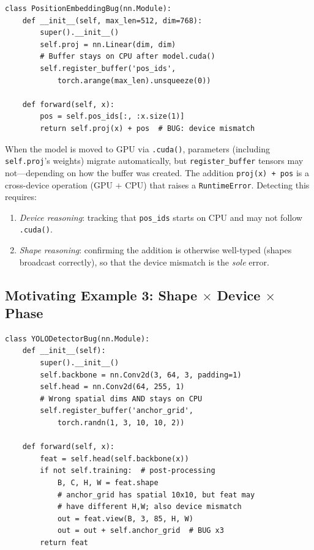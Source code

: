 \documentclass[10pt]{article}
\theoremstyle{plain}
\theoremstyle{definition}
\theoremstyle{remark}
\begin{document}
\begin{lstlisting}[caption={Buffer device mismatch modeled after
  HuggingFace Transformers issue \#13666.},
  label={lst:device-shape}]
class PositionEmbeddingBug(nn.Module):
    def __init__(self, max_len=512, dim=768):
        super().__init__()
        self.proj = nn.Linear(dim, dim)
        # Buffer stays on CPU after model.cuda()
        self.register_buffer('pos_ids',
            torch.arange(max_len).unsqueeze(0))

    def forward(self, x):
        pos = self.pos_ids[:, :x.size(1)]
        return self.proj(x) + pos  # BUG: device mismatch
\end{lstlisting}

When the model is moved to GPU via \texttt{.cuda()}, parameters
(including \texttt{self.proj}'s weights) migrate automatically, but
\texttt{register\_buffer} tensors may not---depending on how the
buffer was created.  The addition \texttt{proj(x) + pos} is a
cross-device operation (GPU $+$ CPU) that raises a
\texttt{RuntimeError}.  Detecting this requires:
\begin{enumerate}[nosep]
  \item \emph{Device reasoning}: tracking that \texttt{pos\_ids}
    starts on CPU and may not follow \texttt{.cuda()}.
  \item \emph{Shape reasoning}: confirming the addition is
    otherwise well-typed (shapes broadcast correctly), so that the
    device mismatch is the \emph{sole} error.
\end{enumerate}

\subsection{Motivating Example 3: Shape $\times$ Device $\times$ Phase}\label{sec:ex-triple}

\begin{lstlisting}[caption={Anchor grid bug modeled after YOLOv5
  post-processing.  Three theories interact simultaneously.},
  label={lst:triple}]
class YOLODetectorBug(nn.Module):
    def __init__(self):
        super().__init__()
        self.backbone = nn.Conv2d(3, 64, 3, padding=1)
        self.head = nn.Conv2d(64, 255, 1)
        # Wrong spatial dims AND stays on CPU
        self.register_buffer('anchor_grid',
            torch.randn(1, 3, 10, 10, 2))

    def forward(self, x):
        feat = self.head(self.backbone(x))
        if not self.training:  # post-processing
            B, C, H, W = feat.shape
            # anchor_grid has spatial 10x10, but feat may
            # have different H,W; also device mismatch
            out = feat.view(B, 3, 85, H, W)
            out = out + self.anchor_grid  # BUG x3
        return feat
\end{lstlisting}
\end{document}
